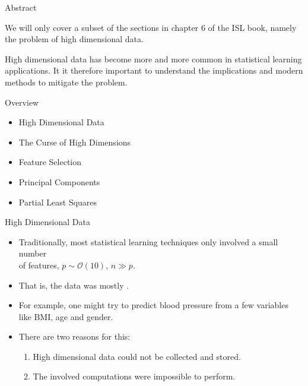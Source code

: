 \documentclass[mathserif, aspectratio=169]{beamer}
\subtitle{\bfseries%
  {High Dimensons}\\%
  {\tiny\it High Dimensional Data, The Curse of High Dimensions Dimension Reduction, Principal Components, Partial Least Squares}\\%
}
\begin{document}


\begin{frame}{Abstract}
	\begin{blurb}
		We will only cover a subset of the sections in chapter 6 of the ISL book,
		namely the problem of high dimensional data.

		High dimensional data has become more and more common in statistical
		learning applications. It it therefore important to understand the implications
		and modern methods to mitigate the problem.
	\end{blurb}
\end{frame}

\begin{frame}{Overview}
	\begin{itemize}
		\item High Dimensional Data
		\item The Curse of High Dimensions
		\item Feature Selection
		\item Principal Components
		\item Partial Least Squares
	\end{itemize}
\end{frame}

\begin{frame}{High Dimensional Data}
	\begin{itemize}
		\item Traditionally, most statistical learning techniques only involved
			a small number \\ of features, $p\sim\mathcal{O}(10)$, $n \gg p$.
		\item That is, the data was mostly .
		\item For example, one might try to predict blood pressure from a few variables\\
			like BMI, age and gender.
		\item There are two reasons for this:
			\begin{enumerate}
				\item High dimensional data could not be collected and stored.
				\item The involved computations were impossible to perform.
			\end{enumerate}
	\end{itemize}
\end{frame}
\end{document}
